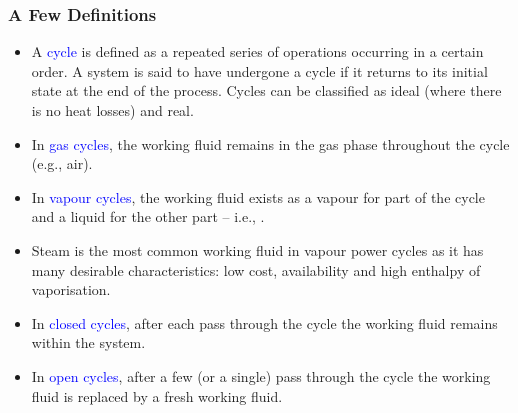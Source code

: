\documentclass[10pt,compress,handout,unknownkeysallowed]{beamer}
\begin{document}
\begin{frame}
 \frametitle{A Few Definitions}
 \begin{itemize}
  \item <1-> A \textcolor{blue}{cycle} is defined as a repeated series of operations occurring in a certain order. A system is said to have undergone a cycle if it returns to its initial state at the end of the process.  Cycles can be classified as ideal (where there is no heat losses) and real. 
  \item <2-> In \textcolor{blue}{gas cycles}, the working fluid remains in the gas phase throughout the cycle (e.g., air).
  \item <3-> In \textcolor{blue}{vapour cycles}, the working fluid exists as a vapour for part of the cycle and a liquid for the other part -- i.e., .
  \item <4-> Steam is the most common working fluid in vapour power cycles as it has many desirable characteristics: low cost, availability and high enthalpy of vaporisation.
  \item <5-> In \textcolor{blue}{closed cycles}, after each pass through the cycle the working fluid remains within the system.
  \item <6-> In \textcolor{blue}{open cycles}, after a few (or a single) pass through the cycle the working fluid is replaced by a fresh working fluid.
 \end{itemize}
\end{frame}
\end{document}

